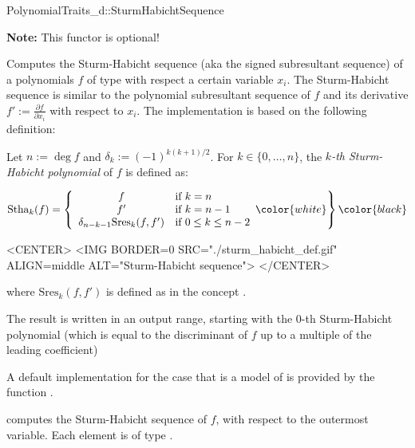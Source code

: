 \begin{ccRefConcept}{PolynomialTraits_d::SturmHabichtSequence}

\textbf{Note:} This functor is optional!

\ccDefinition

Computes the Sturm-Habicht sequence 
(aka the signed subresultant sequence)
of a polynomials $f$ of type 
 with respect a certain variable $x_i$.
The Sturm-Habicht sequence is similar to the polynomial subresultant sequence
of $f$ and its derivative $f':=\frac{\partial f}{\partial x_i}$
with respect to $x_i$. The implementation is based on the following definition:

Let $n:=\deg f$ and $\delta_k:=(-1)^{k(k+1)/2}$. 
For $k\in\{0,\ldots,n\}$, the {\it $k$-th Sturm-Habicht polynomial} 
of $f$ is defined as:

\begin{ccTexOnly}
$$\mathrm{Stha}_k(f)=\left\{\begin{array}{cl}
f & \textrm{if\ } k=n\\
f' & \textrm{if\ } k=n-1\\
\delta_{n-k-1}\mathrm{Sres}_k(f,f') &\textrm{if\ } 0\leq k\leq n-2
\end{array}\color{white}\right\}\color{black}$$
\end{ccTexOnly}

\begin{ccHtmlOnly}
<CENTER>
<IMG BORDER=0 SRC="./sturm_habicht_def.gif" ALIGN=middle ALT="Sturm-Habicht sequence">
</CENTER>
\end{ccHtmlOnly}

where $\mathrm{Sres}_k(f,f')$ is defined 
as in the concept .

The result is written in an output range, 
starting with the $0$-th Sturm-Habicht polynomial (which is equal to
the discriminant of $f$ up to a multiple of the leading coefficient)

A default implementation for the case that 
is a model of 
is provided by the function .

\ccOperations
{}
         { computes the Sturm-Habicht sequence of $f$, 
           with respect to the outermost variable. Each element is of type
           .}


\end{ccRefConcept}
